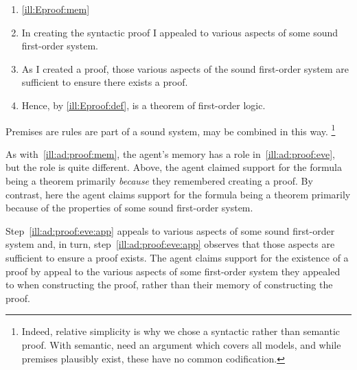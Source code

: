 \begin{note}
  \begin{illustration}[\adB{}]
    \label{ill:ad:proof:eve}
    \mbox{}
    \vspace{-\baselineskip}
    \begin{enumerate}
    \item \illEproofMem{} \hfill \ref{ill:Eproof:mem}
    \item
      \label{ill:ad:proof:eve:app}
      In creating the syntactic proof I appealed to various aspects of some sound first-order system.
    \item
      \label{ill:ad:proof:eve:pos}
      As I created a proof, those various aspects of the sound first-order system are sufficient to ensure there exists a proof.
    \item
      Hence, by \ref{ill:Eproof:def},  is a theorem of first-order logic.
    \end{enumerate}
    \vspace{-\baselineskip}
  \end{illustration}

  {
    \color{red}
    Premises are rules are part of a sound system, may be combined in this way.%
    \footnote{
      Indeed, relative simplicity is why we chose a syntactic rather than semantic proof.
      With semantic, need an argument which covers all models, and while premises plausibly exist, these have no common codification.
    }
  }

  As with~\autoref{ill:ad:proof:mem}, the agent's memory has a role in~\autoref{ill:ad:proof:eve}, but the role is quite different.
  Above, the agent claimed support for the formula being a theorem primarily \emph{because} they remembered creating a proof.
  By contrast, here the agent claims support for the formula being a theorem primarily because of the properties of some sound first-order system.

  Step~\ref{ill:ad:proof:eve:app} appeals to various aspects of some sound first-order system and, in turn, step~\ref{ill:ad:proof:eve:app} observes that those aspects are sufficient to ensure a proof exists.
  The agent claims support for the existence of a proof by appeal to the various aspects of some first-order system they appealed to when constructing the proof, rather than their memory of constructing the proof.
\end{note}

